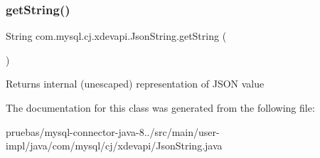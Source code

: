 \subsubsection{\texorpdfstring{get\+String()}{getString()}}
{\footnotesize\ttfamily String com.\+mysql.\+cj.\+xdevapi.\+Json\+String.\+get\+String (\begin{DoxyParamCaption}{ }\end{DoxyParamCaption})}

\begin{DoxyReturn}{Returns}
internal (unescaped) representation of J\+S\+ON value 
\end{DoxyReturn}


The documentation for this class was generated from the following file\+:\begin{DoxyCompactItemize}
\item 
pruebas/mysql-\/connector-\/java-\/8../src/main/user-\/impl/java/com/mysql/cj/xdevapi/Json\+String.\+java\end{DoxyCompactItemize}
